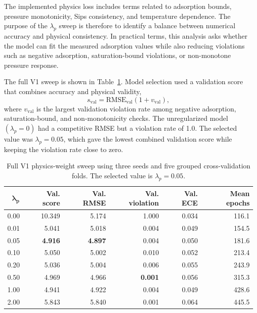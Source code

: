 \documentclass[11pt]{article}
\begin{document}
The implemented physics loss includes terms related to adsorption bounds,
pressure monotonicity, Sips consistency, and temperature dependence. The purpose
of the \(\lambda_p\) sweep is therefore to identify a balance between numerical
accuracy and physical consistency. In practical terms, this analysis asks
whether the model can fit the measured adsorption values while also reducing
violations such as negative adsorption, saturation-bound violations, or
non-monotone pressure response.

The full V1 sweep is shown in Table~\ref{tab:v1-lambda-sweep}. Model selection
used a validation score that combines accuracy and physical validity,
\[
    s_{\mathrm{val}}
    =
    \mathrm{RMSE}_{\mathrm{val}}
    \left(1+v_{\mathrm{val}}\right),
\]
where \(v_{\mathrm{val}}\) is the largest validation violation rate among
negative adsorption, saturation-bound, and non-monotonicity checks. The
unregularized model \((\lambda_p=0)\) had a competitive RMSE but a violation
rate of 1.0. The selected value was \(\lambda_p=0.05\), which gave the lowest
combined validation score while keeping the violation rate close to zero.

\begin{table}[htbp]
    \centering
    \small
    \begin{tabular}{rrrrrr}
        \toprule
        \(\boldsymbol{\lambda_p}\) & \textbf{Val. score}
                                   & \textbf{Val. RMSE}   & \textbf{Val. violation} & \textbf{Val. ECE}
                                   & \textbf{Mean epochs}                                                               \\
        \midrule
        0.00                       & 10.349               & 5.174                   & 1.000             & 0.034 & 116.1 \\
        0.01                       & 5.041                & 5.018                   & 0.004             & 0.049 & 154.5 \\
        0.05                       & \textbf{4.916}       & \textbf{4.897}          & 0.004             & 0.050 & 181.6 \\
        0.10                       & 5.050                & 5.002                   & 0.010             & 0.052 & 213.4 \\
        0.20                       & 5.036                & 5.004                   & 0.006             & 0.055 & 243.9 \\
        0.50                       & 4.969                & 4.966                   & \textbf{0.001}    & 0.056 & 315.3 \\
        1.00                       & 4.941                & 4.922                   & 0.004             & 0.049 & 428.6 \\
        2.00                       & 5.843                & 5.840                   & 0.001             & 0.064 & 445.5 \\
        \bottomrule
    \end{tabular}
    \caption{Full V1 physics-weight sweep using three seeds and five grouped
        cross-validation folds. The selected value is \(\lambda_p=0.05\).}
    \label{tab:v1-lambda-sweep}
\end{table}
\end{document}
